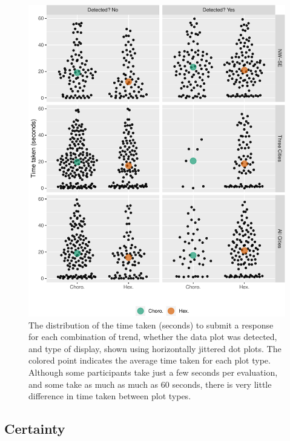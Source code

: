 \documentclass[journal]{vgtc}                     %
\begin{document}
\begin{figure}
\includegraphics[width=1\linewidth]{paper_files/figure-latex/beeswarm-1} \caption{The distribution of the time taken (seconds) to submit a response for each combination of trend, whether the data plot was detected, and type of display, shown using horizontally jittered dot plots. The colored point indicates the average time taken for each plot type. Although some participants take just a few seconds per evaluation, and some take as much as much as 60 seconds, there is very little difference in time taken between plot types.}\label{fig:beeswarm}
\end{figure}

\hypertarget{certainty}{%
\subsection{Certainty}\label{certainty}}
\end{document}
